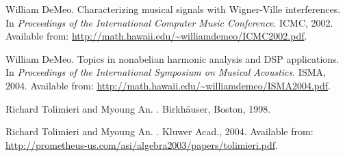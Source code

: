 \documentclass[10pt]{article}
\begin{document}
\def\cprime{$'$} \def\cprime{$'$}
  \def\ocirc#1{\ifmmode\setbox0=\hbox{$#1$}\dimen0=\ht0 \advance\dimen0
  by1pt\rlap{\hbox to\wd0{\hss\raise\dimen0
  \hbox{\hskip.2em$\scriptscriptstyle\circ$}\hss}}#1\else {\accent"17 #1}\fi}
\begin{thebibliography}{1}

William DeMeo.
\newblock Characterizing musical signals with {W}igner-{V}ille interferences.
\newblock In {\em Proceedings of the International Computer Music Conference}.
  ICMC, 2002.
\newblock Available from:
  \url{http://math.hawaii.edu/~williamdemeo/ICMC2002.pdf}.

William DeMeo.
\newblock Topics in nonabelian harmonic analysis and {DSP} applications.
\newblock In {\em Proceedings of the International Symposium on Musical
  Acoustics}. ISMA, 2004.
\newblock Available from:
  \url{http://math.hawaii.edu/~williamdemeo/ISMA2004.pdf}.

Richard Tolimieri and Myoung An.
.
\newblock Birkh\"{a}user, Boston, 1998.

Richard Tolimieri and Myoung An.
.
\newblock Kluwer Acad., 2004.
\newblock Available from:
  \url{http://prometheus-us.com/asi/algebra2003/papers/tolimieri.pdf}.

\end{thebibliography}
\end{document}
